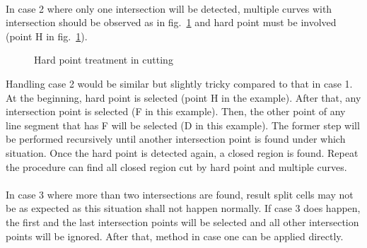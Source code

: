 \paragraph{}
In case 2 where only one intersection will be detected, multiple curves with intersection should be observed as in fig.~\ref{qdt_fig:qdt_cutting_hard_point} and hard point must be involved (point H in fig.~\ref{qdt_fig:qdt_cutting_hard_point}).
    \begin{figure}
        \centering
        \caption[Hard point treatment in cutting]{Hard point treatment in cutting}
        \label{qdt_fig:qdt_cutting_hard_point}
    \end{figure}
Handling case 2 would be similar but slightly tricky compared to that in case 1.
At the beginning, hard point is selected (point H in the example).
After that, any intersection point is selected (F in this example).
Then, the other point of any line segment that has F will be selected (D in this example).
The former step will be performed recursively until another intersection point is found under which situation.
Once the hard point is detected again, a closed region is found.
Repeat the procedure can find all closed region cut by hard point and multiple curves.

\paragraph{}
In case 3 where more than two intersections are found, result split cells may not be as expected as this situation shall not happen normally.
If case 3 does happen, the first and the last intersection points will be selected and all other intersection points will be ignored.
After that, method in case one can be applied directly.


